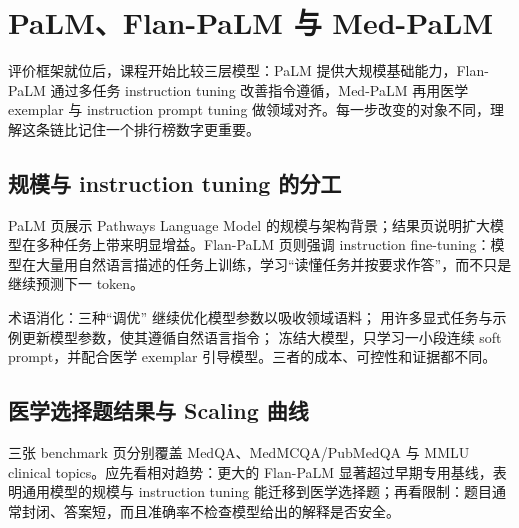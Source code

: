 \section{PaLM、Flan-PaLM 与 Med-PaLM}

评价框架就位后，课程开始比较三层模型：PaLM 提供大规模基础能力，Flan-PaLM 通过多任务 instruction tuning 改善指令遵循，Med-PaLM 再用医学 exemplar 与 instruction prompt tuning 做领域对齐。每一步改变的对象不同，理解这条链比记住一个排行榜数字更重要。

\subsection{规模与 instruction tuning 的分工}

PaLM 页展示 Pathways Language Model 的规模与架构背景；结果页说明扩大模型在多种任务上带来明显增益。Flan-PaLM 页则强调 instruction fine-tuning：模型在大量用自然语言描述的任务上训练，学习“读懂任务并按要求作答”，而不只是继续预测下一 token。




\begin{knowledgebox}{术语消化：三种“调优”}
 继续优化模型参数以吸收领域语料； 用许多显式任务与示例更新模型参数，使其遵循自然语言指令； 冻结大模型，只学习一小段连续 soft prompt，并配合医学 exemplar 引导模型。三者的成本、可控性和证据都不同。
\end{knowledgebox}

\subsection{医学选择题结果与 Scaling 曲线}

三张 benchmark 页分别覆盖 MedQA、MedMCQA/PubMedQA 与 MMLU clinical topics。应先看相对趋势：更大的 Flan-PaLM 显著超过早期专用基线，表明通用模型的规模与 instruction tuning 能迁移到医学选择题；再看限制：题目通常封闭、答案短，而且准确率不检查模型给出的解释是否安全。



